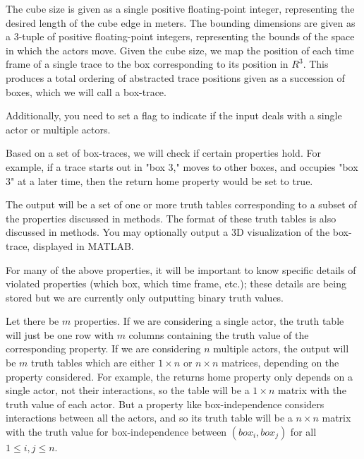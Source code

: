 The cube size is given as a single positive floating-point integer, representing the desired length of the cube edge in meters.
The bounding dimensions are given as a 3-tuple of positive floating-point integers, representing the bounds of the space in which the actors move.
Given the cube size, we map the position of each time frame of a single trace to the box corresponding to its position in $R^3$.
 This produces a total ordering of abstracted trace positions given as a succession of boxes, which we will call a box-trace.
 
 Additionally, you need to set a flag to indicate if the input deals with a single actor or multiple actors.
 
 Based on a set of box-traces, we will check if certain properties hold.
 For example, if a trace starts out in "box 3," moves to other boxes, and occupies "box 3" at a later time, then the return home property would be set to true.
 
 The output will be a set of one or more truth tables corresponding to a subset of the properties discussed in methods.
 The format of these truth tables is also discussed in methods.
 You may optionally output a 3D visualization of the box-trace, displayed in MATLAB.
 
 For many of the above properties, it will be important to know specific details of violated properties (which box, which time frame, etc.); these details are being stored but we are currently only outputting binary truth values. 
 
 Let there be $m$ properties.
 If we are considering a single actor, the truth table will just be one row with $m$ columns containing the truth value of the corresponding property.
 If we are considering $n$ multiple actors, the output will be $m$ truth tables which are either $1 \times n$ or $n \times n$ matrices, depending on the property considered.
 For example, the returns home property only depends on a single actor, not their interactions, so the table will be a $1 \times n$ matrix with the truth value of each actor.
 But a property like box-independence considers interactions between all the actors, and so its truth table will be a $n \times n$ matrix with the truth value for box-independence between $(box_i,box_j)$ for all $1 \leq i,j \leq n$.


